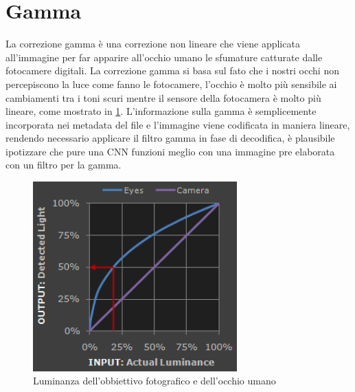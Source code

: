 \section{Gamma}\label{gamma}

La correzione gamma è una correzione non lineare che viene applicata all'immagine per far apparire all'occhio umano le sfumature catturate dalle fotocamere digitali. La correzione gamma si basa sul fato che i nostri occhi non percepiscono la luce come fanno le fotocamere, l'occhio è molto più sensibile ai cambiamenti tra i toni scuri mentre il sensore della fotocamera è molto più lineare, come mostrato in \cref{fig:gamma}. L'informazione sulla gamma è semplicemente incorporata nei metadata del file e l'immagine viene codificata in maniera lineare, rendendo necessario applicare il filtro gamma in fase di decodifica, è plausibile ipotizzare che pure una CNN funzioni meglio con una immagine pre elaborata con un filtro per la gamma\cite{gamma}.

\begin{figure}[ht]
    \centering
    \includegraphics[width=0.7\textwidth]{preprocessing/gamma.png}
    \caption{Luminanza dell'obbiettivo fotografico e dell'occhio umano}
    \label{fig:gamma}
\end{figure}



